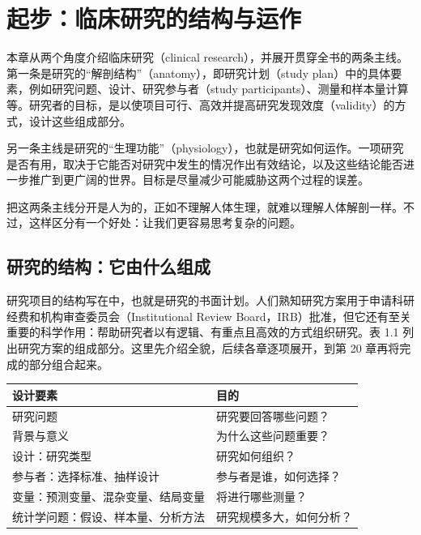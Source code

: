 \chapter{起步：临床研究的结构与运作}
\label{ch:01}

本章从两个角度介绍临床研究（clinical research），并展开贯穿全书的两条主线。第一条是研究的“解剖结构”（anatomy），即研究计划（study plan）中的具体要素，例如研究问题、设计、研究参与者（study participants）、测量和样本量计算等。研究者的目标，是以使项目可行、高效并提高研究发现效度（validity）的方式，设计这些组成部分。

另一条主线是研究的“生理功能”（physiology），也就是研究如何运作。一项研究是否有用，取决于它能否对研究中发生的情况作出有效结论，以及这些结论能否进一步推广到更广阔的世界。目标是尽量减少可能威胁这两个过程的误差。

把这两条主线分开是人为的，正如不理解人体生理，就难以理解人体解剖一样。不过，这样区分有一个好处：让我们更容易思考复杂的问题。

\section{研究的结构：它由什么组成}
研究项目的结构写在中，也就是研究的书面计划。人们熟知研究方案用于申请科研经费和机构审查委员会（Institutional Review Board，IRB）批准，但它还有至关重要的科学作用：帮助研究者以有逻辑、有重点且高效的方式组织研究。表 1.1 列出研究方案的组成部分。这里先介绍全貌，后续各章逐项展开，到第 20 章再将完成的部分组合起来。

\begin{center}\small
{}
\begin{tabularx}{\linewidth}{L{62mm}Y}
\toprule\textbf{设计要素}&\textbf{目的}\\\midrule
研究问题&研究要回答哪些问题？\\
背景与意义&为什么这些问题重要？\\
设计：研究类型&研究如何组织？\\
参与者：选择标准、抽样设计&参与者是谁，如何选择？\\
变量：预测变量、混杂变量、结局变量&将进行哪些测量？\\
统计学问题：假设、样本量、分析方法&研究规模多大，如何分析？\\\bottomrule
\end{tabularx}\end{center}

